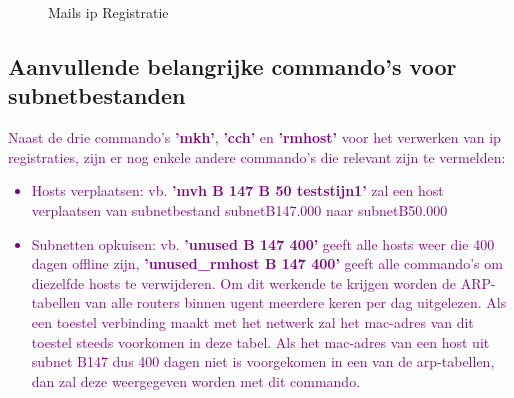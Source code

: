 \begin{figure}[H]
    \hspace*{\fill}
    \hspace*{\fill}
    \caption{Mails \acrshort{ip} Registratie}
    \label{fig:netadminMail}
\end{figure}

\subsection{Aanvullende belangrijke commando's voor subnetbestanden}
\textcolor{purple}{Naast de drie commando's \textbf{'mkh'}, \textbf{'cch'} en \textbf{'rmhost'} voor het verwerken van \acrshort{ip} registraties, zijn er nog enkele andere commando's die relevant zijn te vermelden:}
\textcolor{purple}{
    \begin{itemize}
        \item Hosts verplaatsen: vb. \textbf{'mvh B 147 B 50 teststijn1'} zal een host verplaatsen van subnetbestand subnetB147.000 naar subnetB50.000 
        \item Subnetten opkuisen: vb. \textbf{'unused B 147 400'} geeft alle hosts weer die 400 dagen offline zijn, \textbf{'unused\_rmhost B 147 400'} geeft alle commando's om diezelfde hosts te verwijderen. Om dit werkende te krijgen worden de \acrshort{ARP}-tabellen van alle routers binnen \acrshort{ugent} meerdere keren per dag uitgelezen. Als een toestel verbinding maakt met het netwerk zal het \acrshort{mac}-adres van dit toestel steeds voorkomen in deze tabel. Als het \acrshort{mac}-adres van een host uit subnet B147 dus 400 dagen niet is voorgekomen in een van de \acrshort{arp}-tabellen, dan zal deze weergegeven worden met dit commando.
    \end{itemize}
}

